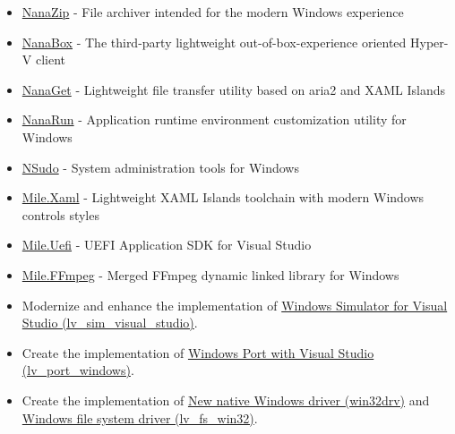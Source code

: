 \documentclass{resume}
\begin{document}
\begin{itemize}
  \item \href{https://github.com/M2Team/NanaZip}{NanaZip} - File archiver intended for the modern Windows experience
  \item \href{https://github.com/M2Team/NanaBox}{NanaBox} - The third-party lightweight out-of-box-experience oriented Hyper-V client
  \item \href{https://github.com/M2Team/NanaGet}{NanaGet} - Lightweight file transfer utility based on aria2 and XAML Islands
  \item \href{https://github.com/M2Team/NanaRun}{NanaRun} - Application runtime environment customization utility for Windows
  \item \href{https://github.com/M2Team/NSudo}{NSudo} - System administration tools for Windows
\end{itemize} 

\begin{itemize}
  \item \href{https://github.com/ProjectMile/Mile.Xaml}{Mile.Xaml} - Lightweight XAML Islands toolchain with modern Windows controls styles
  \item \href{https://github.com/ProjectMile/Mile.Uefi}{Mile.Uefi} - UEFI Application SDK for Visual Studio
  \item \href{https://github.com/ProjectMile/Mile.FFmpeg}{Mile.FFmpeg} - Merged FFmpeg dynamic linked library for Windows
\end{itemize} 

\begin{itemize}
  \item Modernize and enhance the implementation of \href{https://github.com/lvgl/lv_sim_visual_studio}{Windows Simulator for Visual Studio (lv\_sim\_visual\_studio)}.
  \item Create the implementation of \href{https://github.com/lvgl/lv_port_windows}{Windows Port with Visual Studio (lv\_port\_windows)}.
  \item Create the implementation of \href{https://github.com/lvgl/lv_drivers/pull/117}{New native Windows driver (win32drv)} and \href{https://github.com/lvgl/lvgl/pull/2701}{Windows file system driver (lv\_fs\_win32)}.
\end{itemize}
\end{document}
